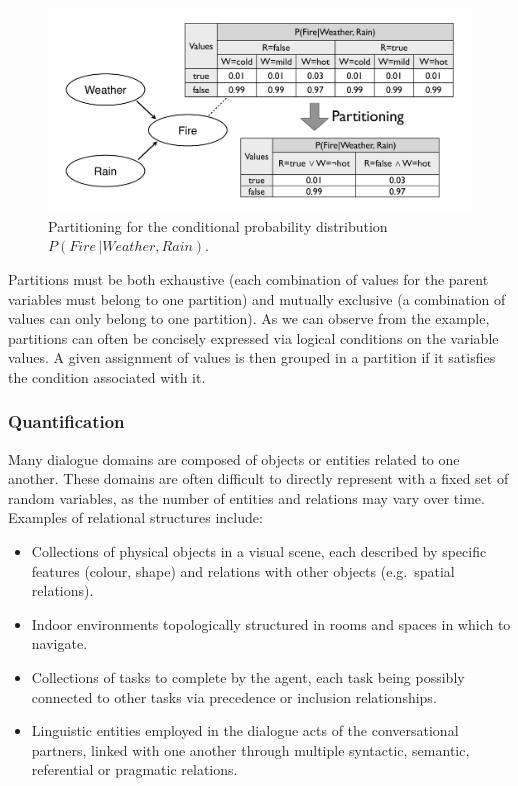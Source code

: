 

 \begin{figure}[ht]
\centering
\includegraphics[scale=0.25]{imgs/partitioning.pdf}
\caption{Partitioning for the conditional probability distribution $P(\mathit{Fire} \, | \mathit{Weather}, \mathit{Rain})$.}
\label{fig:partitioning}
\end{figure}

Partitions must be both exhaustive (each combination of values for the parent variables must belong to one partition) and mutually exclusive (a combination of values can only belong to one partition).  As we can observe from the example, partitions can often be concisely expressed via logical conditions on the variable values.  A given assignment of values is then grouped in a partition if it satisfies the condition associated with it. 

\subsubsection*{Quantification}

Many dialogue domains are composed of objects or entities related to one another. These domains are often difficult to directly represent with a fixed set of random variables, as the number of entities and relations may vary over time.  Examples of relational structures include: 
\begin{itemize}
\item Collections of physical objects in a visual scene, each described by specific features (colour, shape) and relations with other objects (e.g.\ spatial relations).
\item Indoor environments topologically structured in rooms and spaces in which to navigate. 
\item Collections of tasks to complete by the agent, each task being possibly connected to other tasks via precedence or inclusion relationships.
\item Linguistic entities employed in the dialogue acts of the conversational partners, linked with one another through multiple syntactic, semantic, referential or pragmatic relations. 
\end{itemize}


